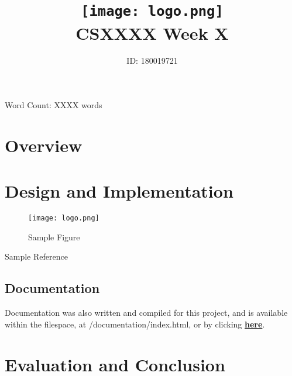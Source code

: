 \documentclass[hidelinks, a4paper, table]{article}
\title{\texttt{[image: logo.png]} \\ CSXXXX Week X}
\author{ID: 180019721}
\begin{document}
 
\maketitle
\begin{center}
Word Count: XXXX words
\end{center}
\tableofcontents

\newpage

\section{Overview}

\section{Design and Implementation}

\begin{figure}[H]
\centering
\texttt{[image: logo.png]}
\caption{Sample Figure}
\label{fig:image1}
\end{figure}

Sample Reference\cite{1}

\subsection{Documentation}
Documentation was also written and compiled for this project, and is available within the filespace, at /documentation/index.html, or by clicking \href{run:./documentation/index.html}{\textbf{here}}.

\section{Evaluation and Conclusion}

\newpage

\nocite{*}
\begingroup

\endgroup

\listoffigures
\end{document}
